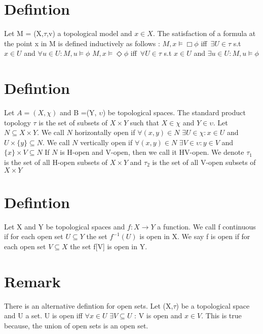 \documentclass[12pt, a4paper]{scrreprt}
\begin{document}
\section{Defintion}
Let M = (X,$\tau$,v) a topological model and $x \in X$. The satisfaction of a formula
at the point x in M is defined inductively as follows :
\newline
$M,x \models \Box \phi$ iff $\, \exists U \in \tau$ s.t $x \in U$ and $\forall u \in U : M,u \models \phi$
\newline
$M,x \models \Diamond \phi$ iff $\, \forall U \in \tau$ s.t $x \in U$ and $\exists u \in U : M,u \models \phi$

\section{Defintion}
Let $A = (X, \chi)$ and B =(Y, $\upsilon$) be topological spaces. The standard product topology $\tau$ is the set of subsets of 
$X \times Y$ such that $X \in \chi$ and $Y \in \upsilon$. \newline
Let $N \subseteq X \times Y $. We call $N$ horizontally open if $\forall (x,y) \in N $ $\exists U \in \chi : x \in U $ and $ U \times \{ y \} \subseteq N$. \newline We call $N$ 
vertically open if $\forall (x,y) \in N$ $\exists V \in \upsilon : y \in V$ and  $ \{ x \} \times V \subseteq N$ \newline
If $N$ is H-open and V-open, then we call it HV-open. \newline
We denote $\tau_1$ is the set of all H-open subsets of $X \times Y$ and $\tau_2$ is the set of all V-open subsets of $X\times Y$

\section{Defintion}
Let X and Y be topological spaces and $f : X \rightarrow Y$ a function.
We call f continuous if for each open set $U \subseteq Y$ the set $f^{-1}(U)$ is open in X. We say f 
is open if for each open set $V \subseteq X$ the set f[V] is open in Y.

\section{Remark}
There is an alternative defintion for open sets. Let (X,$\tau$) be a topological space and U a set.
U is open iff $\forall x \in U$  $\exists V\subseteq U$ : V is open and $x \in V$. This is true because,
the union of open sets is an open set.
\newline
\newline
\end{document}
